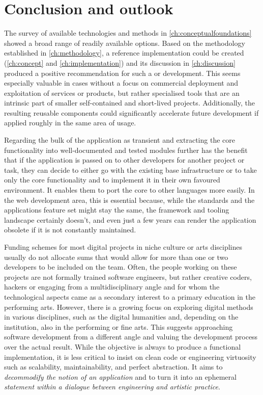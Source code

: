 \chapter{Conclusion and outlook}
\label{ch:conclusion-and-outlook}

The survey of available technologies and methods in \autoref{ch:conceptualfoundations} showed a broad range of readily available options.
Based on the methodology established in \autoref{ch:methodology}, a reference implementation could be created (\autoref{ch:concept} and \autoref{ch:implementation}) and its discussion in \autoref{ch:discussion} produced a positive recommendation for such a  or  development.
This seems especially valuable in cases without a focus on commercial deployment and exploitation of services or products, but rather specialised tools that are an intrinsic part of smaller self-contained and short-lived projects.
Additionally, the resulting reusable components could significantly accelerate future development if applied roughly in the same area of usage.

Regarding the bulk of the application as transient and extracting the core functionality into well-documented and tested modules further has the benefit that if the application is passed on to other developers for another project or task, they can decide to either go with the existing base infrastructure or to take only the core functionality and to implement it in their own favoured environment.
It enables them to port the core to other languages more easily.
In the web development area, this is essential because, while the standards and the application\textquotesingle s feature set might stay the same, the framework and tooling landscape certainly doesn't, and even just a few years can render the application obsolete if it is not constantly maintained.

Funding schemes for most digital projects in niche culture or arts disciplines usually do not allocate sums that would allow for more than one or two developers to be included on the team.
Often, the people working on these projects are not formally trained software engineers, but rather creative coders, hackers or engaging from a multidisciplinary angle and for whom the technological aspects came as a secondary interest to a primary education in the performing arts.
However, there is a growing focus on exploring digital methods in various disciplines, such as the digital humanities and, depending on the institution, also in the performing or fine arts.
This suggests approaching software development from a different angle and valuing the development process over the actual result.
While the objective is always to produce a functional implementation, it is less critical to insist on clean code or engineering virtuosity such as scalability, maintainability, and perfect abstraction.
It aims to \emph{decommodify the notion of an application} and to turn it into an ephemeral \emph{statement within a dialogue between engineering and artistic practice}.

